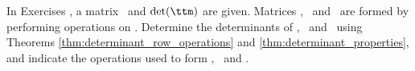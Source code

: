 {\noin In Exercises }
{, a matrix \ttm\ and $\det(\ttm)$ are given. Matrices \tta, \ttb\ and \ttc\ are formed by performing operations on \ttm. Determine the determinants of \tta, \ttb\ and \ttc\ using Theorems 
\ref{thm:determinant_row_operations} and \ref{thm:determinant_properties},
  and indicate the operations used to form \tta, \ttb\ and \ttc.}
